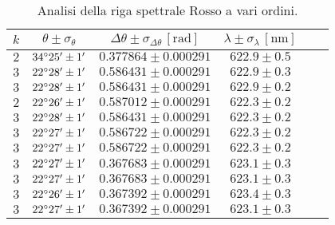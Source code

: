 \documentclass[]{article}
\begin{document}
    \begin{table}
        \centering
        \begin{tabular}{||c|c|c|c|c|c||}
            \hline
            $k$ & $\theta \pm \sigma_{\theta}$ & $\Delta\theta \pm \sigma_{\Delta\theta} \, \left[\text{rad}\right]$ & $\lambda \pm \sigma_{\lambda} \, \left[\text{nm}\right]$ \\\hline
            \hline
            $2$ & $34\degree 25' \pm 1'$ & $0.377864 \pm 0.000291$ & $622.9 \pm 0.5$ \\\hline
            $3$ & $22\degree 28' \pm 1'$ & $0.586431 \pm 0.000291$ & $622.9 \pm 0.3$ \\\hline
            $3$ & $22\degree 28' \pm 1'$ & $0.586431 \pm 0.000291$ & $622.9 \pm 0.2$ \\\hline
            $2$ & $22\degree 26' \pm 1'$ & $0.587012 \pm 0.000291$ & $622.3 \pm 0.2$ \\\hline
            $3$ & $22\degree 28' \pm 1'$ & $0.586431 \pm 0.000291$ & $622.3 \pm 0.2$ \\\hline
            $3$ & $22\degree 27' \pm 1'$ & $0.586722 \pm 0.000291$ & $622.3 \pm 0.2$ \\\hline
            $3$ & $22\degree 27' \pm 1'$ & $0.586722 \pm 0.000291$ & $622.3 \pm 0.2$ \\\hline
            $3$ & $22\degree 27' \pm 1'$ & $0.367683 \pm 0.000291$ & $623.1 \pm 0.3$ \\\hline
            $3$ & $22\degree 27' \pm 1'$ & $0.367683 \pm 0.000291$ & $623.1 \pm 0.3$ \\\hline
            $3$ & $22\degree 26' \pm 1'$ & $0.367392 \pm 0.000291$ & $623.4 \pm 0.3$ \\\hline
            $3$ & $22\degree 27' \pm 1'$ & $0.367392 \pm 0.000291$ & $623.1 \pm 0.3$ \\\hline
        \end{tabular}
        \label{rosso}
        \caption{Analisi della riga spettrale Rosso a vari ordini.}
    \end{table}
\end{document}
